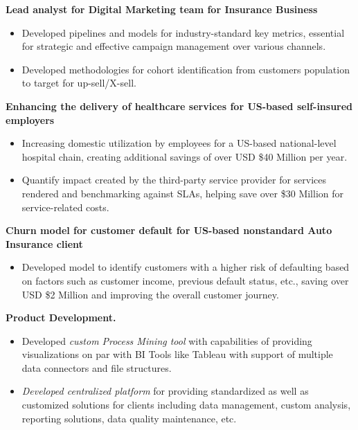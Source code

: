 \documentclass[10pt,a4paper]{altacv}
\begin{document}
\textbf{Lead analyst for Digital Marketing team for Insurance Business}
\begin{itemize}
    \item Developed pipelines and models for industry-standard key metrics, essential for strategic and effective campaign management over various channels.
    \item Developed methodologies for cohort identification from customers population to target for up-sell/X-sell.
\end{itemize}

\vspace{5px}


\textbf{Enhancing the delivery of healthcare services for US-based self-insured employers}
\begin{itemize}
    \item Increasing domestic utilization by employees for a US-based national-level hospital chain, creating additional savings of over USD \$40 Million per year.
    \item Quantify impact created by the third-party service provider for services rendered and benchmarking against SLAs, helping save over \$30 Million for service-related costs. 
\end{itemize}

\vspace{5px}

\textbf{Churn model for customer default for US-based nonstandard Auto Insurance client}
\begin{itemize}
    \item Developed model to identify customers with a higher risk of defaulting based on factors such as customer income, previous default status, etc., saving over USD \$2 Million and improving the overall customer journey.
\end{itemize}

\vspace{5px}

\textbf{Product Development.}
\begin{itemize}
    \item Developed \emph{custom Process Mining tool} with capabilities of providing visualizations on par with BI Tools like Tableau with support of multiple data connectors and file structures.
    \item \emph{Developed centralized platform} for providing standardized as well as customized solutions for clients including data management, custom analysis, reporting solutions, data quality maintenance, etc.
\end{itemize}

\vspace{10px}




\medskip
\end{document}
